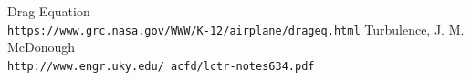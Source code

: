\documentclass{article}
\begin{document}
\newpage
\begin{thebibliography}{2}
Drag Equation
\\\texttt{https://www.grc.nasa.gov/WWW/K-12/airplane/drageq.html}
Turbulence, J. M. McDonough
\\\texttt{http://www.engr.uky.edu/~acfd/lctr-notes634.pdf}
\end{thebibliography}
\end{document}
